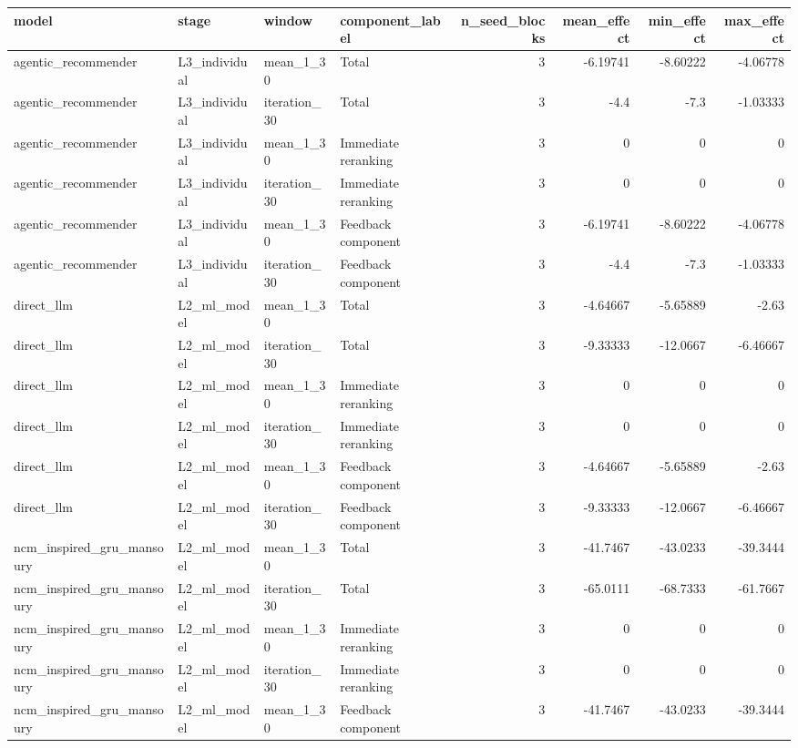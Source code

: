 \begin{table}[htbp!]
\centering
\small
\setlength{\tabcolsep}{3pt}
\renewcommand{\arraystretch}{1.1}
\begin{tabular}{llllrrrr}
\hline
model & stage & window & component\_label & n\_seed\_blocks & mean\_effect & min\_effect & max\_effect \\
\hline
agentic\_recommender & L3\_individual & mean\_1\_30 & Total & 3 & -6.19741 & -8.60222 & -4.06778 \\
agentic\_recommender & L3\_individual & iteration\_30 & Total & 3 & -4.4 & -7.3 & -1.03333 \\
agentic\_recommender & L3\_individual & mean\_1\_30 & Immediate reranking & 3 & 0 & 0 & 0 \\
agentic\_recommender & L3\_individual & iteration\_30 & Immediate reranking & 3 & 0 & 0 & 0 \\
agentic\_recommender & L3\_individual & mean\_1\_30 & Feedback component & 3 & -6.19741 & -8.60222 & -4.06778 \\
agentic\_recommender & L3\_individual & iteration\_30 & Feedback component & 3 & -4.4 & -7.3 & -1.03333 \\
direct\_llm & L2\_ml\_model & mean\_1\_30 & Total & 3 & -4.64667 & -5.65889 & -2.63 \\
direct\_llm & L2\_ml\_model & iteration\_30 & Total & 3 & -9.33333 & -12.0667 & -6.46667 \\
direct\_llm & L2\_ml\_model & mean\_1\_30 & Immediate reranking & 3 & 0 & 0 & 0 \\
direct\_llm & L2\_ml\_model & iteration\_30 & Immediate reranking & 3 & 0 & 0 & 0 \\
direct\_llm & L2\_ml\_model & mean\_1\_30 & Feedback component & 3 & -4.64667 & -5.65889 & -2.63 \\
direct\_llm & L2\_ml\_model & iteration\_30 & Feedback component & 3 & -9.33333 & -12.0667 & -6.46667 \\
ncm\_inspired\_gru\_mansoury & L2\_ml\_model & mean\_1\_30 & Total & 3 & -41.7467 & -43.0233 & -39.3444 \\
ncm\_inspired\_gru\_mansoury & L2\_ml\_model & iteration\_30 & Total & 3 & -65.0111 & -68.7333 & -61.7667 \\
ncm\_inspired\_gru\_mansoury & L2\_ml\_model & mean\_1\_30 & Immediate reranking & 3 & 0 & 0 & 0 \\
ncm\_inspired\_gru\_mansoury & L2\_ml\_model & iteration\_30 & Immediate reranking & 3 & 0 & 0 & 0 \\
ncm\_inspired\_gru\_mansoury & L2\_ml\_model & mean\_1\_30 & Feedback component & 3 & -41.7467 & -43.0233 & -39.3444 \\

\end{tabular}
\end{table}
